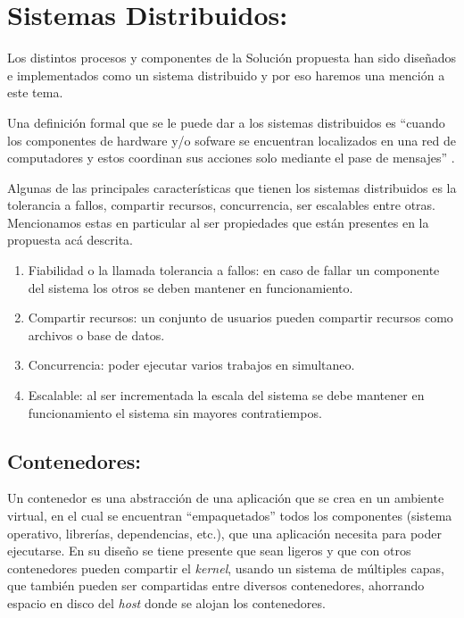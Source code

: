 \documentclass[
  10,
  openany]{book}
\begin{document}
\hypertarget{sistemas-distribuidos}{%
\section{Sistemas Distribuidos:}\label{sistemas-distribuidos}}

Los distintos procesos y componentes de la Solución propuesta han sido diseñados e implementados como un sistema distribuido y por eso haremos una mención a este tema.

Una definición formal que se le puede dar a los sistemas distribuidos es ``cuando los componentes de hardware y/o sofware se encuentran localizados en una red de computadores y estos coordinan sus acciones solo mediante el pase de mensajes'' \citep{distribu2012}.

Algunas de las principales características que tienen los sistemas distribuidos es la tolerancia a fallos, compartir recursos, concurrencia, ser escalables \citep{czaja2018} entre otras. Mencionamos estas en particular al ser propiedades que están presentes en la propuesta acá descrita.

\begin{enumerate}
\def\labelenumi{\arabic{enumi}.}
\item
  Fiabilidad o la llamada tolerancia a fallos: en caso de fallar un componente del sistema los otros se deben mantener en funcionamiento.
\item
  Compartir recursos: un conjunto de usuarios pueden compartir recursos como archivos o base de datos.
\item
  Concurrencia: poder ejecutar varios trabajos en simultaneo.
\item
  Escalable: al ser incrementada la escala del sistema se debe mantener en funcionamiento el sistema sin mayores contratiempos.
\end{enumerate}

\hypertarget{contenedores}{%
\subsection{Contenedores:}\label{contenedores}}

Un contenedor es una abstracción de una aplicación que se crea en un ambiente virtual, en el cual se encuentran ``empaquetados'' todos los componentes (sistema operativo, librerías, dependencias, etc.), que una aplicación necesita para poder ejecutarse. En su diseño se tiene presente que sean ligeros y que con otros contenedores pueden compartir el \emph{kernel}, usando un sistema de múltiples capas, que también pueden ser compartidas entre diversos contenedores, ahorrando espacio en disco del \emph{host} donde se alojan los contenedores.
\end{document}
